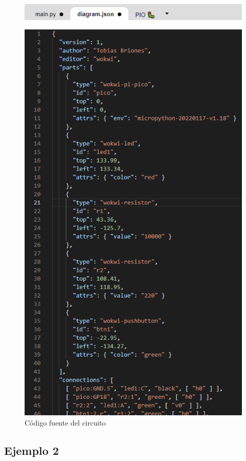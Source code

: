 \documentclass{article}
\begin{document}
    \begin{figure}[H]
        \centering
        \includegraphics[width=0.3\paperwidth]
        {images/wokwi-example-1-diagram-src-code}
        \caption{Código fuente del circuito}
    \end{figure}

    \subsection{Ejemplo 2}
\end{document}
